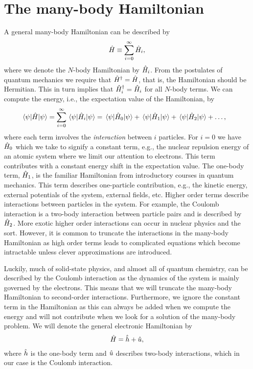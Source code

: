     \section{The many-body Hamiltonian}
        A general many-body Hamiltonian can be described by
        \begin{align}
            \hat{H} \equiv \sum_{i = 0}^{\infty} \hat{H}_i,
        \end{align}
        where we denote the $N$-body Hamiltonian by $\hat{H}_i$.
        From the postulates of quantum mechanics we require that
        $\hat{H}^{\dagger} = \hat{H}$, that is, the Hamiltonian should be
        Hermitian.
        This in turn implies that $\hat{H}_i^{\dagger} = \hat{H}_i$ for all
        $N$-body terms.
        We can compute the energy, i.e., the expectation value of the
        Hamiltonian, by
        \begin{align}
            \mel{\psi}{\hat{H}}{\psi}
            &= \sum_{i = 0}^{\infty} \mel{\psi}{\hat{H}_i}{\psi}
            = \mel{\psi}{\hat{H}_0}{\psi}
            + \mel{\psi}{\hat{H}_1}{\psi}
            + \mel{\psi}{\hat{H}_2}{\psi}
            + \dots,
        \end{align}
        where each term involves the \emph{interaction} between $i$ particles.
        For $i = 0$ we have $\hat{H}_0$ which we take to signify a constant term,
        e.g., the nuclear repulsion energy of an atomic system where we limit
        our attention to electrons.
        This term contributes with a constant energy shift in the expectation
        value.
        The one-body term, $\hat{H}_1$, is the familiar Hamiltonian from
        introductory courses in quantum mechanics.
        This term describes one-particle contribution, e.g., the kinetic
        energy, external potentials of the system, external fields, etc.
        Higher order terms describe interactions between particles in the
        system.
        For example, the Coulomb interaction is a two-body interaction between
        particle pairs and is described by $\hat{H}_2$.
        More exotic higher order interactions can occur in nuclear physics and
        the sort.
        However, it is common to truncate the interactions in the many-body
        Hamiltonian as high order terms leads to complicated equations which
        become intractable unless clever approximations are introduced.

        Luckily, much of solid-state physics, and almost all of quantum
        chemistry, can be described by the Coulomb interaction as the dynamics
        of the system is mainly governed by the electrons.
        This means that we will truncate the many-body Hamiltonian to
        second-order interactions.
        Furthermore, we ignore the constant term in the Hamiltonian as this can
        always be added when we compute the energy and will not contribute when
        we look for a solution of the many-body problem.
        We will denote the general electronic Hamiltonian by
        \begin{align}
            \hat{H} = \hat{h} + \hat{u},
        \end{align}
        where $\hat{h}$ is the one-body term and $\hat{u}$ describes
        two-body interactions, which in our case is the Coulomb interaction.

